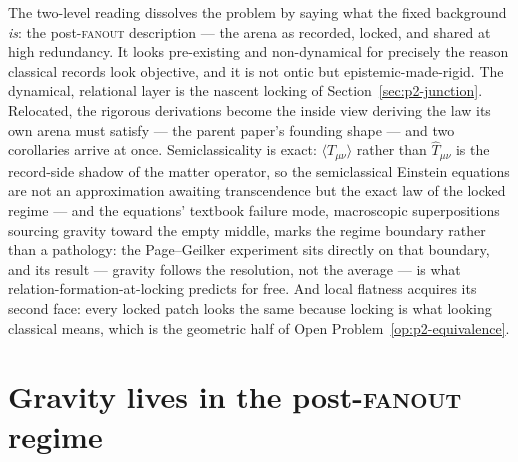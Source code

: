 \documentclass[11pt,a4paper]{article}
\newcommand{\fanout}{\textsc{fanout}}
\begin{document}
The two-level reading dissolves the problem by saying what the fixed background \emph{is}: the
post-\fanout{} description --- the arena as recorded, locked, and shared at high redundancy. It
looks pre-existing and non-dynamical for precisely the reason classical records look objective,
and it is not ontic but epistemic-made-rigid. The dynamical, relational layer is the nascent
locking of Section~\ref{sec:p2-junction}. Relocated, the rigorous derivations become the inside
view deriving the law its own arena must satisfy --- the parent paper's founding shape --- and two
corollaries arrive at once. Semiclassicality is exact: $\langle T_{\mu\nu}\rangle$ rather than
$\hat{T}_{\mu\nu}$ is the record-side shadow of the matter operator, so the semiclassical Einstein
equations are not an approximation awaiting transcendence but the exact law of the locked regime
--- and the equations' textbook failure mode, macroscopic superpositions sourcing gravity toward
the empty middle, marks the regime boundary rather than a pathology: the Page--Geilker experiment
\autocite{pagegeilker1981} sits directly on that boundary, and its result --- gravity follows the
resolution, not the average --- is what relation-formation-at-locking predicts for free. And local
flatness acquires its second face: every locked patch looks the same because locking is what
looking classical means, which is the geometric half of Open Problem~\ref{op:p2-equivalence}.


\section{Gravity lives in the post-\fanout{} regime}
\label{sec:p2-postfanout}
\end{document}
